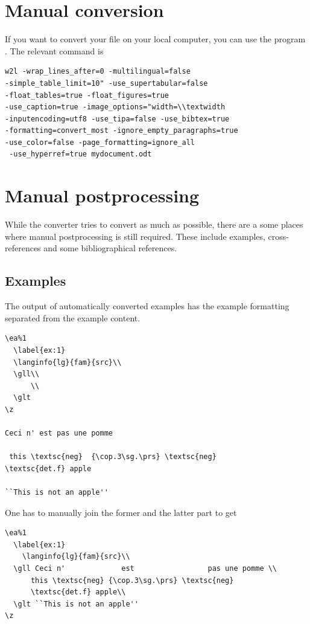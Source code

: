 \section{Manual conversion}
If you want to convert your file on your local computer, you can use the program . The relevant command is 
\begin{verbatim}
w2l -wrap_lines_after=0 -multilingual=false 
-simple_table_limit=10" -use_supertabular=false 
-float_tables=true -float_figures=true 
-use_caption=true -image_options="width=\\textwidth 
-inputencoding=utf8 -use_tipa=false -use_bibtex=true  
-formatting=convert_most -ignore_empty_paragraphs=true 
-use_color=false -page_formatting=ignore_all
 -use_hyperref=true mydocument.odt
\end{verbatim}

\section{Manual postprocessing}
While the converter tries to convert as much as possible, there are a some places where manual postprocessing is still required.
These include examples, cross-references and some bibliographical references.

\subsection{Examples}
The output of automatically converted examples has the example formatting separated from the example content.  
\begin{verbatim}
\ea%1
  \label{ex:1}
  \langinfo{lg}{fam}{src}\\
  \gll\\
      \\
  \glt
\z

Ceci n' est pas une pomme

 this \textsc{neg}  {\cop.3\sg.\prs} \textsc{neg}   
\textsc{det.f} apple

``This is not an apple''
\end{verbatim}

One has to manually join the former and the latter part to get

\begin{verbatim}
\ea%1
  \label{ex:1}
    \langinfo{lg}{fam}{src}\\
  \gll Ceci n'             est                 pas une pomme \\
      this \textsc{neg} {\cop.3\sg.\prs} \textsc{neg}   
      \textsc{det.f} apple\\
  \glt ``This is not an apple''
\z 
\end{verbatim} 

